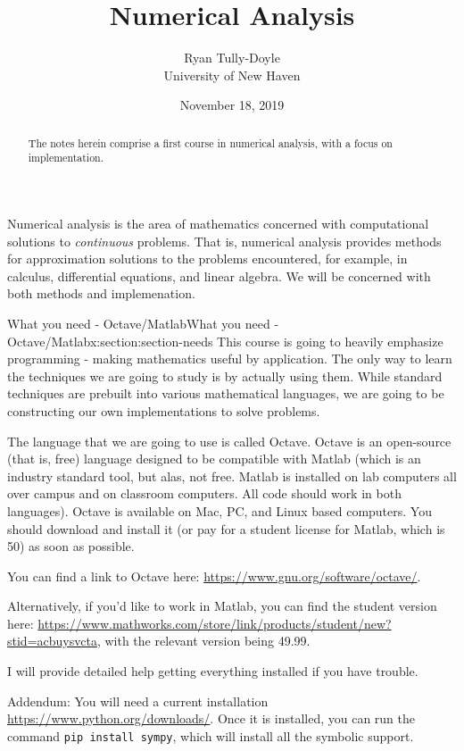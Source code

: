 \documentclass[oneside,10pt,]{article}
\title{Numerical Analysis}
\author{Ryan Tully-Doyle\\
University of New Haven
}
\date{November 18, 2019}
\newcommand{\mono}[1]{\texttt{#1}}
\numberwithin{equation}{section}
\numberwithin{equation}{section}
\begin{document}
\hypertarget{x:article:minimal}{}
\maketitle
\thispagestyle{empty}
\begin{abstract}
The notes herein comprise a first course in numerical analysis, with a focus on implementation.%
\end{abstract}
\begin{introduction}{}%
Numerical analysis is the area of mathematics concerned with computational solutions to \emph{continuous} problems. That is, numerical analysis provides methods for approximation solutions to the problems encountered, for example, in calculus, differential equations, and linear algebra. We will be concerned with both methods and implemenation.%
\end{introduction}%
%
%
\typeout{************************************************}
\typeout{************************************************}
%
\begin{sectionptx}{What you need - Octave\slash{}Matlab}{}{What you need - Octave\slash{}Matlab}{}{}{x:section:section-needs}
This course is going to heavily emphasize programming - making mathematics useful by application. The only way to learn the techniques we are going to study is by actually using them. While standard techniques are prebuilt into various mathematical languages, we are going to be constructing our own implementations to solve problems.%
\par
The language that we are going to use is called Octave. Octave is an open-source (that is, free) language designed to be compatible with Matlab (which is an industry standard tool, but alas, not free. Matlab is installed on lab computers all over campus and on classroom computers. All code should work in both languages). Octave is available on Mac, PC, and Linux based computers. You should download and install it (or pay for a student license for Matlab, which is \textdollar{}50) as soon as possible.%
\par
You can find a link to Octave here: \href{}{https:\slash{}\slash{}www.gnu.org\slash{}software\slash{}octave\slash{}}.%
\par
Alternatively, if you'd like to work in Matlab, you can find the student version here: \href{}{https:\slash{}\slash{}www.mathworks.com\slash{}store\slash{}link\slash{}products\slash{}student\slash{}new?s\textunderscore{}tid=ac\textunderscore{}buy\textunderscore{}sv\textunderscore{}cta}, with the relevant version being \textdollar{}49.99.%
\par
I will provide detailed help getting everything installed if you have trouble.%
\par
Addendum: You will need a current installation \href{}{https:\slash{}\slash{}www.python.org\slash{}downloads\slash{}}. Once it is installed, you can run the command \mono{pip install sympy}, which will install all the symbolic support.%
\end{sectionptx}
\end{document}
